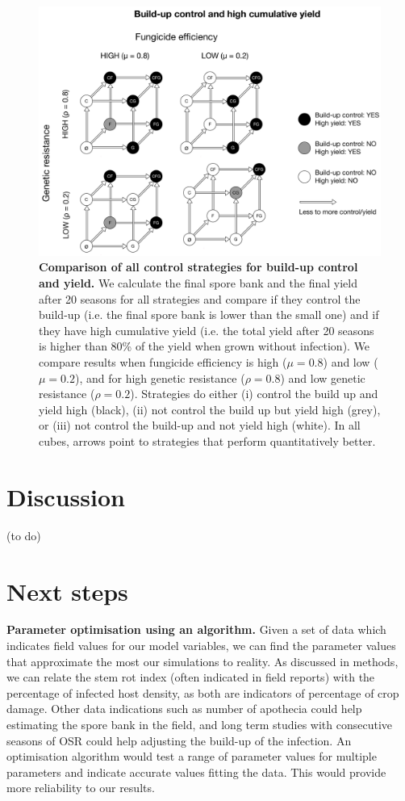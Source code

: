 \documentclass{article}
\begin{document}
 \begin{figure}
 \includegraphics[width=\columnwidth]{SCL_Fig/SCL_FigF.pdf}
\caption{\label{fig:figF}\textbf{Comparison of all control strategies for build-up control and yield.}
We calculate the final spore bank and the final yield after 20 seasons for all strategies and compare if they control the build-up (i.e. the final spore bank is lower than the small one) and if they have high cumulative yield (i.e. the total yield after 20 seasons is higher than 80\% of the yield when grown without infection). We compare results when fungicide efficiency is high ($\mu = 0.8$) and low ($\mu = 0.2$), and for high genetic resistance ($\rho = 0.8$) and low genetic resistance ($\rho = 0.2$). Strategies do either (i) control the build up and yield high (black), (ii) not control the build up but yield high (grey), or (iii) not control the build-up and not yield high (white). In all cubes, arrows point to strategies that perform quantitatively better. }
\end{figure}

\section{Discussion}

 (to do)
 
 
\section{Next steps}

\textbf{Parameter optimisation using an algorithm.} Given a set of data which indicates field values for our model variables, we can find the parameter values that approximate the most our simulations to reality. As discussed in methods, we can relate the stem rot index (often indicated in field reports) with the percentage of infected host density, as both are indicators of percentage of crop damage. Other data indications such as number of apothecia could help estimating the spore bank in the field, and long term studies with consecutive seasons of OSR could help adjusting the build-up of the infection. An optimisation algorithm would test a range of parameter values for multiple parameters and indicate accurate values fitting the data. This would provide more reliability to our results. 
\end{document}

